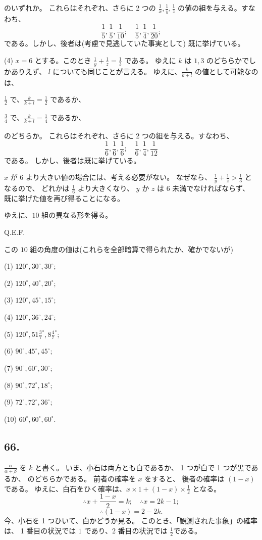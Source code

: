 のいずれか。
これらはそれぞれ、さらに 2 つの
$\frac{1}{x},\frac{1}{y},\frac{1}{z}$
の値の組を与える。すなわち、
\[
\frac{1}{5},\frac{1}{5},\frac{1}{10};
\quad
\frac{1}{5},\frac{1}{4},\frac{1}{20};
\]
である。しかし、後者は(考慮で見逃していた事実として)
既に挙げている。

(4) $x = 6$ とする。このとき $\frac{1}{y} + \frac{1}{z} = \frac{1}{3}$
である。
ゆえに $k$ は $1, 3$ のどちらかでしかありえず、
$l$ についても同じことが言える。
ゆえに、$\frac{k}{k+l}$ の値として可能なのは、

$\frac{1}{2}$ で、$\frac{k}{k+l} = \frac{1}{2}$ であるか、

$\frac{3}{4}$ で、$\frac{k}{k+l} = \frac{1}{4}$ であるか、

のどちらか。
これらはそれぞれ、さらに 2 つの組を与える。すなわち、
\[
\frac{1}{6},\frac{1}{6},\frac{1}{6};
\quad
\frac{1}{6},\frac{1}{4},\frac{1}{12}
\]
である。
しかし、後者は既に挙げている。

$x$ が $6$ より大きい値の場合には、考える必要がない。
なぜなら、
$\frac{1}{y} + \frac{1}{z} > \frac{1}{3}$
となるので、
どれかは $\frac{1}{6}$ より大きくなり、
$y$ か $z$ は $6$ 未満でなければならず、
既に挙げた値を再び得ることになる。

ゆえに、$10$ 組の異なる形を得る。

Q.E.F.

この $10$ 組の角度の値は(これらを全部暗算で得られたか、確かでないが)

(1) $120^\circ, 30^\circ, 30^\circ$;

(2) $120^\circ, 40^\circ, 20^\circ$;

(3) $120^\circ, 45^\circ, 15^\circ$;

(4) $120^\circ, 36^\circ, 24^\circ$;

(5) $120^\circ, 51\frac{3}{7}^\circ, 8\frac{4}{7}^\circ$;

(6) $90^\circ, 45^\circ, 45^\circ$;

(7) $90^\circ, 60^\circ, 30^\circ$;

(8) $90^\circ, 72^\circ, 18^\circ$;

(9) $72^\circ, 72^\circ, 36^\circ$;

(10) $60^\circ, 60^\circ, 60^\circ$.


\subsection*{66.}

$\frac{\alpha}{\alpha + \beta}$ を $k$ と書く。
いま、小石は両方とも白であるか、 1 つが白で 1 つが黒であるか、
のどちらかである。
前者の確率を $x$ をすると、
後者の確率は $(1 - x)$ である。
ゆえに、白石をひく確率は、$x \times 1 + (1 - x) \times \frac{1}{2}$
となる。
\[
\therefore
x + \frac{1-x}{2} = k;
\quad
\therefore
x = 2k - 1;
\]
\[
\therefore
(1 - x) = 2 - 2k.
\]
今、小石を 1 つひいて、白かどうか見る。
このとき、「観測された事象」の確率は、
1 番目の状況では $1$ であり、2 番目の状況では $\frac{1}{2}$である。

